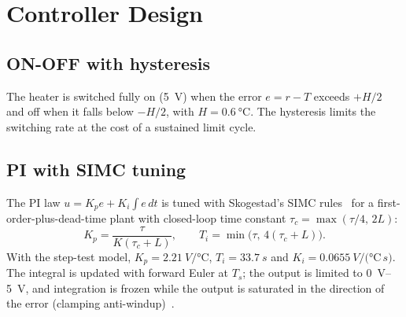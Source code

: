 \documentclass[conference,a4paper]{IEEEtran}
\begin{document}
\section{Controller Design}\label{sec:control}
\subsection{ON-OFF with hysteresis}
The heater is switched fully on (\SI{5}{V}) when the error $e=r-T$ exceeds $+H/2$ and off when it
falls below $-H/2$, with $H=\SI{0.6}{\celsius}$. The hysteresis limits the switching rate at the
cost of a sustained limit cycle.

\subsection{PI with SIMC tuning}
The PI law $u = K_p e + K_i\!\int e\,dt$ is tuned with Skogestad's SIMC rules~\cite{skogestad2003}
for a first-order-plus-dead-time plant with closed-loop time constant $\tau_c=\max(\tau/4,\,2L)$:
\begin{equation}
K_p = \frac{\tau}{K(\tau_c+L)},\qquad T_i=\min\bigl(\tau,\,4(\tau_c+L)\bigr).
\end{equation}
With the step-test model, $K_p=\SI{2.21}{V\per\celsius}$, $T_i=\SI{33.7}{s}$ and
$K_i=\SI{0.0655}{V\per(\celsius\,s)}$. The integral is updated with forward Euler at $T_s$; the
output is limited to \SIrange{0}{5}{V}, and integration is frozen while the output is saturated in
the direction of the error (clamping anti-windup)~\cite{astrom2006}.

\end{document}
